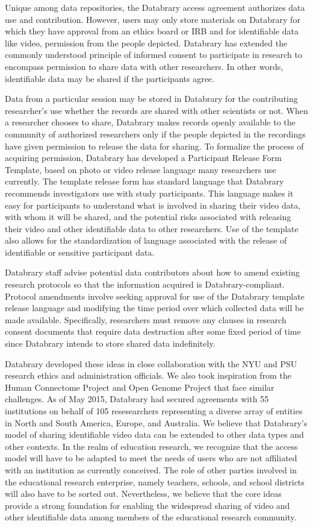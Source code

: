 \documentclass[letterpaper,man,apacite]{apa6}
\begin{document}
Unique among data repositories, the Databrary access agreement authorizes data use and contribution.
However, users may only store materials on Databrary for which they have approval from an ethics board or IRB and for identifiable data like video, permission from the people depicted. 
Databrary has extended the commonly understood principle of informed consent to participate in research to encompass permission to share data with other researchers.
In other words, identifiable data may be shared if the participants agree. 

Data from a particular session may be stored in Databrary for the contributing researcher’s use whether the records are shared with other scientists or not. 
When a researcher chooses to share, Databrary makes records openly available to the community of authorized researchers only if the people depicted in the recordings have given permission to release the data for sharing. 
To formalize the process of acquiring permission, Databrary has developed a Participant Release Form Template, based on photo or video release language many researchers use currently. 
The template release form has standard language that Databrary recommends investigators use with study participants. 
This language makes it easy for participants to understand what is involved in sharing their video data, with whom it will be shared, and the potential risks associated with releasing their video and other identifiable data to other researchers. 
Use of the template also allows for the standardization of language associated with the release of identifiable or sensitive participant data.
 
Databrary staff advise potential data contributors about how to amend existing research protocols so that the information acquired is Databrary-compliant.
Protocol amendments involve seeking approval for use of the Databrary template release language and modifying the time period over which collected data will be made available. 
Specifically, researchers must remove any clauses in research consent documents that require data destruction after some fixed period of time since Databrary intends to store shared data indefinitely.

Databrary developed these ideas in close collaboration with the NYU and PSU research ethics and administration officials.
We also took inspiration from the Human Connectome Project and Open Genome Project that face similar challenges.
As of May 2015, Databrary had secured agreements with 55 institutions on behalf of 105 resesearchers representing a diverse array of entities in North and South America, Europe, and Australia.
We believe that Databrary's model of sharing identifiable video data can be extended to other data types and other contexts.
In the realm of education research, we recognize that the access model will have to be adapted to meet the needs of users who are not affiliated with an institution as currently conceived.
The role of other parties involved in the educational research enterprise, namely teachers, schools, and school districts will also have to be sorted out.
Nevertheless, we believe that the core ideas provide a strong foundation for enabling the widespread sharing of video and other identifiable data among members of the educational research community.
\end{document}
